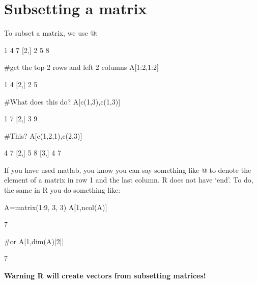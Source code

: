 \section{Subsetting a matrix}
To subset a matrix, we use \verb@[]@:
\begin{Schunk}
\begin{Soutput}
     [,1] [,2] [,3]
[1,]    1    4    7
[2,]    2    5    8
\end{Soutput}
\begin{Sinput}
 #get the top 2 rows and left 2 columns
 A[1:2,1:2]
\end{Sinput}
\begin{Soutput}
     [,1] [,2]
[1,]    1    4
[2,]    2    5
\end{Soutput}
\begin{Sinput}
 #What does this do?
 A[c(1,3),c(1,3)]
\end{Sinput}
\begin{Soutput}
     [,1] [,2]
[1,]    1    7
[2,]    3    9
\end{Soutput}
\begin{Sinput}
 #This?
 A[c(1,2,1),c(2,3)]
\end{Sinput}
\begin{Soutput}
     [,1] [,2]
[1,]    4    7
[2,]    5    8
[3,]    4    7
\end{Soutput}
\end{Schunk}
If you have used matlab, you know you can say something like \verb@A[1,end]@ to denote the element of a matrix in row 1 and the last column.  R does not have `end'.  To do, the same in R you do something like:
\begin{Schunk}
\begin{Sinput}
 A=matrix(1:9, 3, 3)
 A[1,ncol(A)]
\end{Sinput}
\begin{Soutput}
[1] 7
\end{Soutput}
\begin{Sinput}
 #or
 A[1,dim(A)[2]]
\end{Sinput}
\begin{Soutput}
[1] 7
\end{Soutput}
\end{Schunk}

\textbf{Warning R will create vectors from subsetting matrices!}

